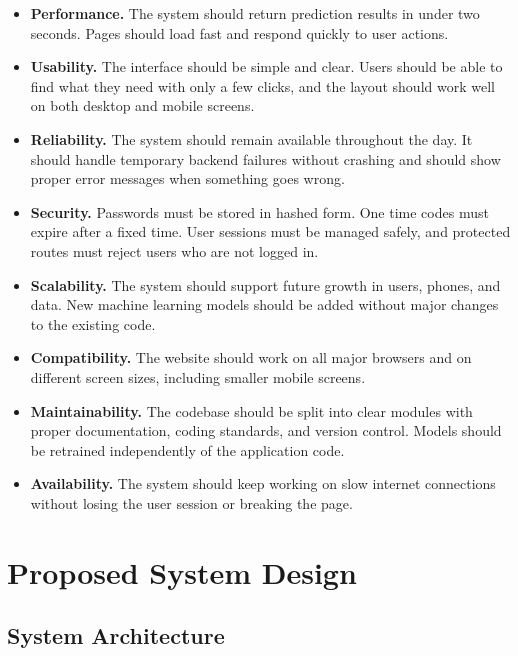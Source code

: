 \documentclass[12pt, a4paper]{report}
\numberwithin{equation}{chapter}
\begin{document}
\begin{itemize}

\item \textbf{Performance.} The system should return prediction results in under two seconds. Pages should load fast and respond quickly to user actions.

\item \textbf{Usability.} The interface should be simple and clear. Users should be able to find what they need with only a few clicks, and the layout should work well on both desktop and mobile screens.

\item \textbf{Reliability.} The system should remain available throughout the day. It should handle temporary backend failures without crashing and should show proper error messages when something goes wrong.

\item \textbf{Security.} Passwords must be stored in hashed form. One time codes must expire after a fixed time. User sessions must be managed safely, and protected routes must reject users who are not logged in.

\item \textbf{Scalability.} The system should support future growth in users, phones, and data. New machine learning models should be added without major changes to the existing code.

\item \textbf{Compatibility.} The website should work on all major browsers and on different screen sizes, including smaller mobile screens.

\item \textbf{Maintainability.} The codebase should be split into clear modules with proper documentation, coding standards, and version control. Models should be retrained independently of the application code.

\item \textbf{Availability.} The system should keep working on slow internet connections without losing the user session or breaking the page.

\end{itemize}

\section{Proposed System Design}

\subsection{System Architecture}
\end{document}
